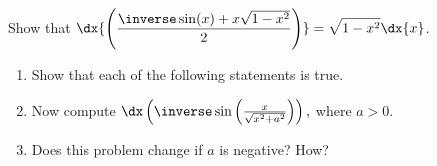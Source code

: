 \begin{embeddedproblem}
  Show that
  $\displaystyle\dx{\left(\dfrac{\inverse\sin(x)+x\sqrt{1-x^2}}{2}\right)}=\sqrt{1-x^2}\dx{x}$.
\end{embeddedproblem}
\begin{embeddedproblem-enumerate}
  \begin{enumerate}[label={\bf{}(\alph*)}]
    \item   Show that each of the following statements is true.
  \begin{enumerate}[label={\bf{}(\roman*)}]
  \end{enumerate}
  \item Now compute
    $\dx\left(\inverse\sin\left(\frac{x}{\sqrt{x^2+a^2}}\right)\right),$
    where $a\gt0.$
  \item  Does this problem change if $a$ is negative? How?
  \end{enumerate}
\end{embeddedproblem-enumerate}

